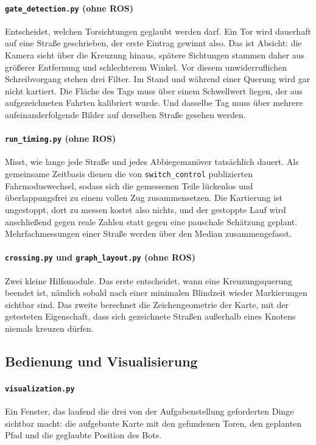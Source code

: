 \documentclass[10pt,a4paper]{article}
\begin{document}
\paragraph{\texttt{gate\_detection.py} (ohne ROS)} Entscheidet, welchen
Torsichtungen geglaubt werden darf. Ein Tor wird dauerhaft auf eine Straße
geschrieben, der erste Eintrag gewinnt also. Das ist Absicht: die Kamera sieht
über die Kreuzung hinaus, spätere Sichtungen stammen daher aus größerer
Entfernung und schlechterem Winkel. Vor diesem unwiderruflichen Schreibvorgang
stehen drei Filter. Im Stand und während einer Querung wird gar nicht
kartiert. Die Fläche des Tags muss über einem Schwellwert liegen, der aus
aufgezeichneten Fahrten kalibriert wurde. Und dasselbe Tag muss über mehrere
aufeinanderfolgende Bilder auf derselben Straße gesehen werden.

\paragraph{\texttt{run\_timing.py} (ohne ROS)} Misst, wie lange jede Straße und
jedes Abbiegemanöver tatsächlich dauert. Als gemeinsame Zeitbasis dienen die
von \texttt{switch\_control} publizierten Fahrmoduswechsel, sodass sich die
gemessenen Teile lückenlos und überlappungsfrei zu einem vollen Zug
zusammensetzen. Die Kartierung ist ungestoppt, dort zu messen kostet also
nichts, und der gestoppte Lauf wird anschließend gegen reale Zahlen statt gegen
eine pauschale Schätzung geplant. Mehrfachmessungen einer Straße werden über
den Median zusammengefasst.

\paragraph{\texttt{crossing.py} und \texttt{graph\_layout.py} (ohne ROS)} Zwei
kleine Hilfsmodule. Das erste entscheidet, wann eine Kreuzungsquerung beendet
ist, nämlich sobald nach einer minimalen Blindzeit wieder Markierungen sichtbar
sind. Das zweite berechnet die Zeichengeometrie der Karte, mit der getesteten
Eigenschaft, dass sich gezeichnete Straßen außerhalb eines Knotens niemals
kreuzen dürfen.

\subsection{Bedienung und Visualisierung}

\paragraph{\texttt{visualization.py}} Ein Fenster, das laufend die drei von der
Aufgabenstellung geforderten Dinge sichtbar macht: die aufgebaute Karte mit den
gefundenen Toren, den geplanten Pfad und die geglaubte Position des Bots.
\end{document}

